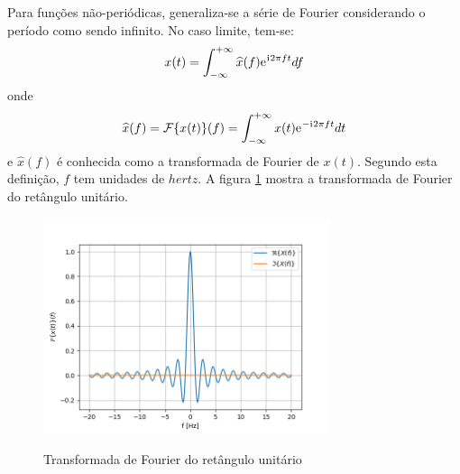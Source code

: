 \documentclass[12pt,a4paper]{report}
\newcommand{\I}{{\mathrm{i}\mkern1mu}}
\newcommand{\euler}{{\mathrm{e}\mkern1mu}}
\begin{document}
  Para funções não-periódicas, generaliza-se a série de Fourier considerando o período como sendo infinito.
  No caso limite, tem-se:
  \begin{equation}
    x(t) = \int_{-\infty}^{+\infty} \widehat{x}(f) \euler^{\I 2 \pi f t} df
  \end{equation}
  onde
  \begin{equation}
    \widehat{x}(f) = \mathcal{F}\{x(t)\}(f) = \int_{-\infty}^{+\infty} x(t) \euler^{-\I 2 \pi f t} dt
  \end{equation}
  e $\widehat{x}(f)$ é conhecida como a transformada de Fourier de $x(t)$. Segundo esta definição, $f$ tem
  unidades de $hertz$. A figura \ref{fig:fourier_transform} mostra a transformada de Fourier do retângulo
  unitário.
  \begin{figure}[H]
    \caption{Transformada de Fourier do retângulo unitário}
    \centering
    \includegraphics[width=0.75\textwidth]{fourier_transform}
    \label{fig:fourier_transform}
  \end{figure}
\end{document}
